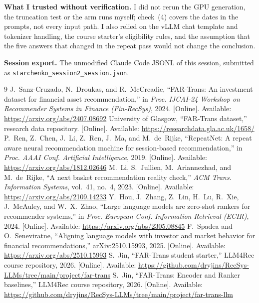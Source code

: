 \documentclass[conference]{IEEEtran}
\begin{document}
\textbf{What I trusted without verification.} I did not rerun the GPU generation, the truncation test or the arm runs myself; check~(4) covers the dates in the prompts, not every input path. I also relied on the vLLM chat template and tokenizer handling, the course starter's eligibility rules, and the assumption that the five answers that changed in the repeat pass would not change the conclusion.

\textbf{Session export.} The unmodified Claude Code JSONL of this session, submitted as \texttt{starchenko\_session2\_\allowbreak session.json}.

\begin{thebibliography}{9}
 J.~Sanz-Cruzado, N.~Droukas, and R.~McCreadie, ``FAR-Trans: An investment dataset for financial asset recommendation,'' in \emph{Proc. IJCAI-24 Workshop on Recommender Systems in Finance (Fin-RecSys)}, 2024. [Online]. Available: \url{https://arxiv.org/abs/2407.08692}
 University of Glasgow, ``FAR-Trans dataset,'' research data repository. [Online]. Available: \url{https://researchdata.gla.ac.uk/1658/}
 P.~Ren, Z.~Chen, J.~Li, Z.~Ren, J.~Ma, and M.~de~Rijke, ``RepeatNet: A repeat aware neural recommendation machine for session-based recommendation,'' in \emph{Proc. AAAI Conf. Artificial Intelligence}, 2019. [Online]. Available: \url{https://arxiv.org/abs/1812.02646}
 M.~Li, S.~Jullien, M.~Ariannezhad, and M.~de~Rijke, ``A next basket recommendation reality check,'' \emph{ACM Trans. Information Systems}, vol.~41, no.~4, 2023. [Online]. Available: \url{https://arxiv.org/abs/2109.14233}
 Y.~Hou, J.~Zhang, Z.~Lin, H.~Lu, R.~Xie, J.~McAuley, and W.~X.~Zhao, ``Large language models are zero-shot rankers for recommender systems,'' in \emph{Proc. European Conf. Information Retrieval (ECIR)}, 2024. [Online]. Available: \url{https://arxiv.org/abs/2305.08845}
 F.~Spadea and O.~Seneviratne, ``Aligning language models with investor and market behavior for financial recommendations,'' arXiv:2510.15993, 2025. [Online]. Available: \url{https://arxiv.org/abs/2510.15993}
 S.~Jin, ``FAR-Trans student starter,'' LLM4Rec course repository, 2026. [Online]. Available: \url{https://github.com/dryjins/RecSys-LLMs/tree/main/project/far-trans}
 S.~Jin, ``FAR-Trans: Encoder and Ranker baselines,'' LLM4Rec course repository, 2026. [Online]. Available: \url{https://github.com/dryjins/RecSys-LLMs/tree/main/project/far-trans-llm}
\end{thebibliography}
\end{document}
